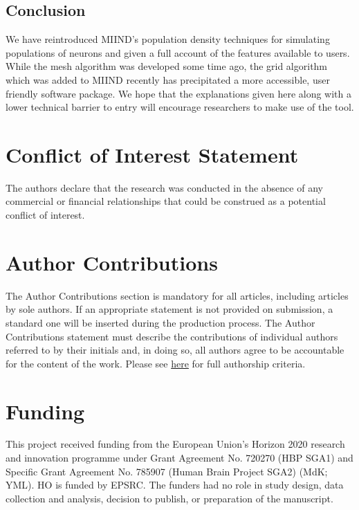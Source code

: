 \documentclass[utf8]{frontiersSCNS} %
\begin{document}
 \subsection*{Conclusion}
 We have reintroduced MIIND's population density techniques for simulating populations of neurons and given a full account of the features available to users. While the mesh algorithm was developed some time ago, the grid algorithm which was added to MIIND recently has precipitated a more accessible, user friendly software package. We hope that the explanations given here along with a lower technical barrier to entry will encourage researchers to make use of the tool. 

\section*{Conflict of Interest Statement}

The authors declare that the research was conducted in the absence of any commercial or financial relationships that could be construed as a potential conflict of interest.

\section*{Author Contributions}

The Author Contributions section is mandatory for all articles, including articles by sole authors. If an appropriate statement is not provided on submission, a standard one will be inserted during the production process. The Author Contributions statement must describe the contributions of individual authors referred to by their initials and, in doing so, all authors agree to be accountable for the content of the work. Please see  \href{http://home.frontiersin.org/about/author-guidelines#AuthorandContributors}{here} for full authorship criteria.

\section*{Funding}
This project received funding from the European Union’s Horizon 2020 research and innovation programme under Grant Agreement No. 720270 (HBP SGA1) and Specific Grant Agreement No. 785907 (Human Brain Project SGA2) (MdK; YML). HO is funded by EPSRC. The funders had no role in study design, data collection and analysis, decision to publish, or preparation of the manuscript.
\end{document}

